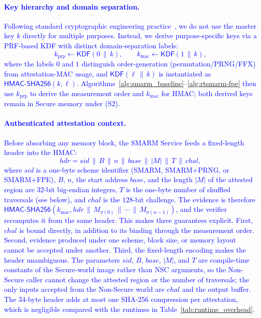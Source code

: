 \documentclass[journal]{IEEEtran}
\newcommand\ben[1]{\textcolor{blue}{#1}}
\newcommand{\rtsmarmone}{SMARM+PRNG\xspace}
\newcommand{\rtsmarmtwo}{SMARM+FPE\xspace}
\begin{document}
\ben{\paragraph{Key hierarchy and domain separation.}
Following standard cryptographic engineering practice~\cite{krawczyk2010hkdf,nist-sp800-108}, we do not use the master key $k$ directly for multiple purposes.
Instead, we derive purpose-specific keys via a PRF-based KDF with distinct domain-separation labels:
\[
  k_{\mathrm{prp}} \gets \mathsf{KDF}(0 \,\|\, k),
  \qquad
  k_{\mathrm{mac}} \gets \mathsf{KDF}(1 \,\|\, k),
\]
where the labels $0$ and $1$ distinguish order-generation (permutation/PRNG/FFX) from attestation-MAC usage, and $\mathsf{KDF}(\ell \,\|\, k)$ is instantiated as $\mathsf{HMAC\text{-}SHA256}(k,\ell)$.
Algorithms~\ref{alg:smarm_baseline}--\ref{alg:rtsmarm-fpe} then use $k_{\mathrm{prp}}$ to derive the measurement order and $k_{\mathrm{mac}}$ for HMAC; both derived keys remain in Secure memory under (S2).}


\paragraph{\ben{Authenticated attestation context.}}
\ben{Before absorbing any memory block, the SMARM Service feeds a fixed-length header into the HMAC:
\[
  \mathit{hdr} = \mathit{sid} \,\|\, B \,\|\, n \,\|\, \mathit{base} \,\|\, |M| \,\|\, T \,\|\, chal,
\]
where $\mathit{sid}$ is a one-byte scheme identifier (SMARM, \rtsmarmone, or \rtsmarmtwo), $B$, $n$, the start address $\mathit{base}$, and the length $|M|$ of the attested region are $32$-bit big-endian integers, $T$ is the one-byte number of shuffled traversals (see below), and $chal$ is the $128$-bit challenge.
The evidence is therefore $\mathsf{HMAC\text{-}SHA256}(k_{\mathrm{mac}}, \mathit{hdr} \,\|\, M_{\sigma(0)} \,\|\, \cdots \,\|\, M_{\sigma(n-1)})$, and the verifier recomputes it from the same header.
This makes three guarantees explicit.
First, $chal$ is bound directly, in addition to its binding through the measurement order.
Second, evidence produced under one scheme, block size, or memory layout cannot be accepted under another.
Third, the fixed-length encoding makes the header unambiguous.
The parameters $\mathit{sid}$, $B$, $\mathit{base}$, $|M|$, and $T$ are compile-time constants of the Secure-world image rather than NSC arguments, so the Non-Secure caller cannot change the attested region or the number of traversals; the only inputs accepted from the Non-Secure world are $chal$ and the output buffer.
The $34$-byte header adds at most one SHA-256 compression per attestation, which is negligible compared with the runtimes in Table~\ref{tab:runtime_overhead}.}
\end{document}
